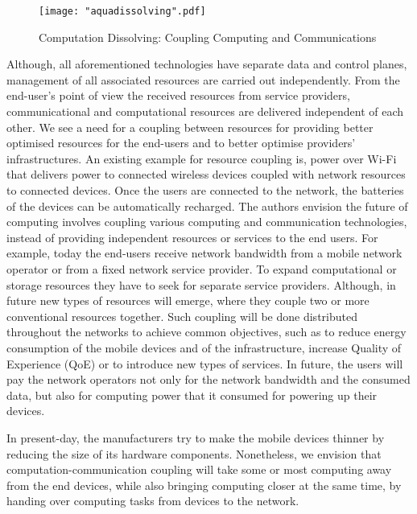 \documentclass[12pt,journal,compsoc, onecolumn]{IEEEtran}
\begin{document}
 \begin{figure*}[ht]
 \centering
 \texttt{[image: "aquadissolving".pdf]}
 \caption{\label{fig:discomp} Computation Dissolving: Coupling Computing and Communications}
 \end{figure*} 
 
Although, all aforementioned technologies have separate data and control planes, management of all associated resources are carried out independently. From the end-user's point of view the received resources from service providers, communicational and computational resources are delivered independent of each other. We see a need for a coupling between resources for providing better optimised resources for the end-users and to better optimise providers' infrastructures. An existing example for resource coupling is, power over Wi-Fi \cite{DBLP:journals/corr/TallaKRNGS15} that delivers power to connected wireless devices coupled with network resources to connected devices. Once the users are connected to the network, the batteries of the devices can be automatically recharged. The authors envision the future of computing involves coupling various computing and communication technologies, instead of providing independent resources or services to the end users. For example, today the end-users receive network bandwidth from a mobile network operator or from a fixed network service provider. To expand computational or storage resources they have to seek for separate service providers. Although, in future new types of resources will emerge, where they couple two or more conventional resources together. Such coupling will be done distributed throughout the networks to achieve common objectives, such as to reduce energy consumption of the mobile devices and of the infrastructure, increase Quality of Experience (QoE) or to introduce new types of services. In future, the users will pay the network operators not only for the network bandwidth and the consumed data, but also for computing power that it consumed for powering up their devices. 

In present-day, the manufacturers try to make the mobile devices thinner by reducing the size of its hardware components. Nonetheless, we envision that computation-communication coupling will take some or most computing away from the end devices, while also bringing computing closer at the same time, by handing over computing tasks from devices to the network.
 
\end{document}
